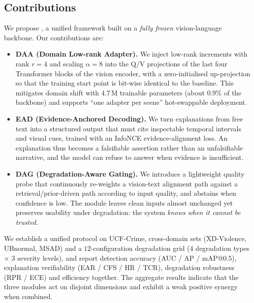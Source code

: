 \subsection{Contributions}

We propose \evivad{}, a unified framework built on a \emph{fully frozen} vision-language backbone. Our contributions are:

\begin{itemize}
  \item \textbf{DAA (Domain Low-rank Adapter).} We inject low-rank increments with rank $r{=}4$ and scaling $\alpha{=}8$ into the Q/V projections of the last four Transformer blocks of the vision encoder, with a zero-initialised up-projection so that the training start point is bit-wise identical to the baseline. This mitigates domain shift with $4.7$\,M trainable parameters (about $0.9\%$ of the backbone) and supports ``one adapter per scene'' hot-swappable deployment.
  \item \textbf{EAD (Evidence-Anchored Decoding).} We turn explanations from free text into a structured output that must cite inspectable temporal intervals and visual cues, trained with an InfoNCE evidence-alignment loss. An explanation thus becomes a falsifiable assertion rather than an unfalsifiable narrative, and the model can refuse to answer when evidence is insufficient.
  \item \textbf{DAG (Degradation-Aware Gating).} We introduce a lightweight quality probe that continuously re-weights a vision-text alignment path against a retrieval/prior-driven path according to input quality, and abstains when confidence is low. The module leaves clean inputs almost unchanged yet preserves usability under degradation: the system \emph{knows when it cannot be trusted}.
\end{itemize}

We establish a unified protocol on UCF-Crime, cross-domain sets (XD-Violence, UBnormal, MSAD) and a $12$-configuration degradation grid ($4$ degradation types $\times$ $3$ severity levels), and report detection accuracy (AUC / AP / mAP@0.5), explanation verifiability (EAR / CFS / HR / TCR), degradation robustness (RPR / ECE) and efficiency together. The aggregate results indicate that the three modules act on disjoint dimensions and exhibit a weak positive synergy when combined.
